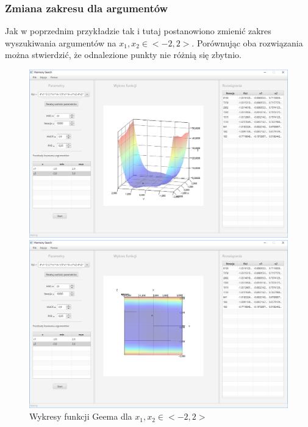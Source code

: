 \documentclass[10pt, a4paper]{article}
\begin{document}
\subsubsection{Zmiana zakresu dla argumentów}
\label{subsubsec:gemm2}
Jak w poprzednim przykładzie tak i tutaj postanowiono zmienić zakres wyszukiwania argumentów na $x_{1}, x_{2} \in <-2,2>$. Porównując oba rozwiązania można stwierdzić, że odnalezione punkty nie różnią się zbytnio. 
\begin{figure}[htbp] 
	\begin{minipage}[b]{.5\textwidth}
		\centering
		\includegraphics[width=\linewidth]{images/22.PNG} 
	\end{minipage} 
	\begin{minipage}[b]{.5\textwidth}
		\centering
		\includegraphics[width=\linewidth]{images/23.PNG} 
	\end{minipage}
	\label{fig:22}
	\caption{Wykresy funkcji Geema dla $x_{1}, x_{2} \in <-2,2>$}
\end{figure}
\end{document}

